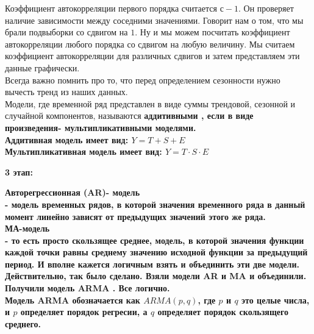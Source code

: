 \documentclass[12pt,a4paper]{paper}
\begin{document}
Коэффициент автокорреляции первого порядка считается $с-1$. Он проверяет наличие зависимости между соседними значениями. Говорит нам о том, что мы брали подвыборки со сдвигом на $1$.
Ну и мы можем посчитать коэффициент автокорреляции любого порядка со сдвигом на любую величину. Мы считаем коэффициент автокорреляции для различных сдвигов и затем представляем эти данные графически.\\

Всегда важно помнить про то, что перед определением сезонности нужно вычесть тренд из наших данных.\\

Модели, где временной ряд представлен в виде суммы трендовой, сезонной и случайной компонентов, называются \bfseries{аддитивными} \mdseries, если в виде произведения- \bfseries{мультипликативными моделями.} \mdseries\\

Аддитивная модель имеет вид: $Y=T+S+E$\\

Мультипликативная модель имеет вид: $Y=T\cdot S \cdot E$\\
\hline  \hline


\newpage

\hline  \hline
\begin{center}
\bfseries\large{3 этап:}\\
\end{center}


\bfseries{Авторегрессионная (AR)- модель} \mdseries\\ - модель временных рядов, в которой значения временного ряда в данный момент линейно зависят от предыдущих значений этого же ряда.\\

\bfseries{МА-модель} \mdseries\\ - то есть просто скользящее среднее, модель, в которой значения функции каждой точки равны среднему значению исходной функции за предыдущий период.
И вполне кажется логичным взять и объединить эти две модели. Действительно, так было сделано. Взяли модели \bfseries{AR} \mdseries и \bfseries{MA} \mdseries и объединили. Получили модель \bfseries{ARMA} \mdseries. Все логично. \\

Модель \bfseries{ARMA} \mdseries обозначается как $ARMA(p, q)$, где $p$ и $q$ это целые числа, и $p$ определяет порядок регресии, а $q$ определяет порядок скользящего среднего.\\ 
\end{document}
